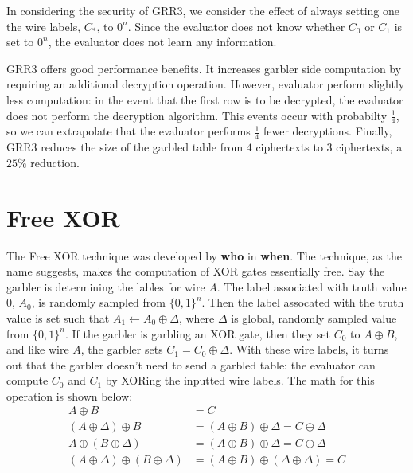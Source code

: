 In considering the security of GRR3, we consider the effect of always setting one the wire labels, $C_*$, to $0^n$.
Since the evaluator does not know whether $C_0$ or $C_1$ is set to $0^n$, the evaluator does not learn any information.

GRR3 offers good performance benefits.
It increases garbler side computation by requiring an additional decryption operation.
However, evaluator perform slightly less computation: in the event that the first row is to be decrypted, the evaluator does not perform the decryption algorithm. 
This events occur with probabilty $\frac{1}{4}$, so we can extrapolate that the evaluator performs $\frac{1}{4}$ fewer decryptions.
Finally, GRR3 reduces the size of the garbled table from $4$ ciphertexts to $3$ ciphertexts, a $25\%$ reduction.

\section{Free XOR}
The Free XOR technique was developed by \textbf{who} in \textbf{when}.
The technique, as the name suggests, makes the computation of XOR gates essentially free.
Say the garbler is determining the lables for wire $A$.
The label associated with truth value $0$, $A_0$, is randomly sampled from $\{0,1\}^n$. 
Then the label assocated with the truth value is set such that $A_1 \gets A_0 \oplus \Delta$, where $\Delta$ is global, randomly sampled value from $\{0,1\}^n$.
If the garbler is garbling an XOR gate, then they set $C_0$ to $A \oplus B$, and like wire $A$, the garbler sets $C_1 = C_0 \oplus \Delta$.
With these wire labels, it turns out that the garbler doesn't need to send a garbled table: the evaluator can compute $C_0$ and $C_1$ by XORing the inputted wire labels.
The math for this operation is shown below:
\begin{align*}
    A \oplus B & = C \\
    (A \oplus \Delta) \oplus B & = (A \oplus B) \oplus \Delta = C \oplus \Delta \\
    A \oplus (B \oplus \Delta) & = (A \oplus B) \oplus \Delta = C \oplus \Delta \\
    (A \oplus \Delta) \oplus (B \oplus \Delta) & = (A \oplus B) \oplus (\Delta \oplus  \Delta) = C 
\end{align*}

